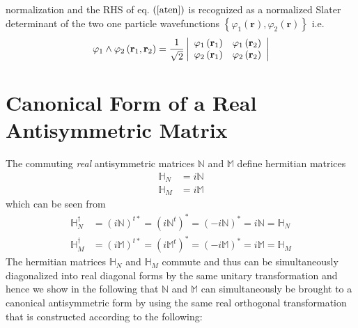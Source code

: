 \documentclass[aps,preprint]{revtex4}%
\begin{document}
normalization and the RHS of eq. $\left(  \ref{aten}\right)  $ is recognized
as a normalized Slater determinant of the two one particle wavefunctions
$\left\{  \varphi_{1}\left(  \mathbf{r}\right)  ,\varphi_{2}\left(
\mathbf{r}\right)  \right\}  $ i.e.%
\begin{equation}
\varphi_{1}\wedge\varphi_{2}\left(  \mathbf{r}_{1},\mathbf{r}_{2}\right)
=\frac{1}{\sqrt{2}}\left\vert
\begin{array}
[c]{cc}%
\varphi_{1}\left(  \mathbf{r}_{1}\right)  & \varphi_{1}\left(  \mathbf{r}%
_{2}\right) \\
\varphi_{2}\left(  \mathbf{r}_{1}\right)  & \varphi_{2}\left(  \mathbf{r}%
_{2}\right)
\end{array}
\right\vert
\end{equation}


\section{Canonical Form of a Real Antisymmetric Matrix\label{realanti}}

The commuting \emph{real }antisymmetric\emph{ }matrices\emph{ }$\mathbb{N}$
and $\mathbb{M}$ define hermitian matrices
\begin{align}
\mathbb{H}_{N}  &  =i\mathbb{N}\nonumber\\
\mathbb{H}_{M}  &  =i\mathbb{M}%
\end{align}
which can be seen from
\begin{align}
\mathbb{H}_{N}^{\dagger}  &  =\left(  i\mathbb{N}\right)  ^{t\ast}=\left(
i\mathbb{N}^{t}\right)  ^{\ast}=\left(  -i\mathbb{N}\right)  ^{\ast
}=i\mathbb{N=H}_{N}\nonumber\\
\mathbb{H}_{M}^{\dagger}  &  =\left(  i\mathbb{M}\right)  ^{t\ast}=\left(
i\mathbb{M}^{t}\right)  ^{\ast}=\left(  -i\mathbb{M}\right)  ^{\ast
}=i\mathbb{M=H}_{M}%
\end{align}
The hermitian matrices $\mathbb{H}_{N}$ and $\mathbb{H}_{M}$ commute and thus
can be simultaneously diagonalized into real diagonal forms by the same
unitary transformation and hence we show in the following that $\mathbb{N}$
and $\mathbb{M}$ can simultaneously be brought to a canonical antisymmetric
form by using the same real orthogonal transformation that is constructed
according to the following:
\end{document}
